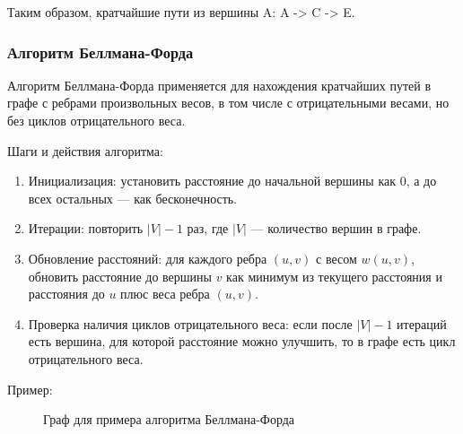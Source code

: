 \documentclass{article}
\begin{document}
Таким образом, кратчайшие пути из вершины A: A -> C -> E.
\pagebreak

\subsubsection*{Алгоритм Беллмана-Форда}
Алгоритм Беллмана-Форда применяется для нахождения кратчайших путей в графе с ребрами произвольных весов, в том числе с отрицательными весами, но без циклов отрицательного веса.

Шаги и действия алгоритма:
\begin{enumerate}
    \item Инициализация: установить расстояние до начальной вершины как 0, а до всех остальных — как бесконечность.
    
    \item Итерации: повторить $|V|-1$ раз, где $|V|$ — количество вершин в графе.
    
    \item Обновление расстояний: для каждого ребра $(u, v)$ с весом $w(u, v)$, обновить расстояние до вершины $v$ как минимум из текущего расстояния и расстояния до $u$ плюс веса ребра $(u, v)$.
    
    \item Проверка наличия циклов отрицательного веса: если после $|V|-1$ итераций есть вершина, для которой расстояние можно улучшить, то в графе есть цикл отрицательного веса.
\end{enumerate}


Пример:

\begin{figure}[ht]
    \centering
    \caption{Граф для примера алгоритма Беллмана-Форда}
\end{figure}
\end{document}
